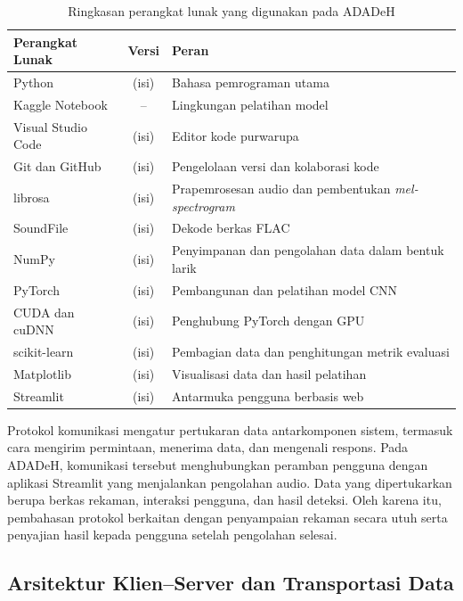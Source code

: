 \begin{table}[t]
  \centering
  \caption{Ringkasan perangkat lunak yang digunakan pada ADADeH}
  \label{tab:software}
  \begin{tabularx}{\textwidth}{| l | c | X |}
    \hline
    \textbf{Perangkat Lunak} & \textbf{Versi} & \textbf{Peran} \\
    \hline
    Python              & (isi) & Bahasa pemrograman utama \\
    Kaggle Notebook     & --    & Lingkungan pelatihan model \\
    Visual Studio Code  & (isi) & Editor kode purwarupa \\
    Git dan GitHub      & (isi) & Pengelolaan versi dan kolaborasi kode \\
    librosa             & (isi) & Prapemrosesan audio dan pembentukan \textit{mel-spectrogram} \\
    SoundFile           & (isi) & Dekode berkas FLAC \\
    NumPy               & (isi) & Penyimpanan dan pengolahan data dalam bentuk larik \\
    PyTorch             & (isi) & Pembangunan dan pelatihan model CNN \\
    CUDA dan cuDNN      & (isi) & Penghubung PyTorch dengan GPU \\
    scikit-learn        & (isi) & Pembagian data dan penghitungan metrik evaluasi \\
    Matplotlib          & (isi) & Visualisasi data dan hasil pelatihan \\
    Streamlit           & (isi) & Antarmuka pengguna berbasis web \\
    \hline
  \end{tabularx}
\end{table}

Protokol komunikasi mengatur pertukaran data antarkomponen sistem, termasuk cara mengirim permintaan, menerima data, dan mengenali respons. Pada ADADeH, komunikasi tersebut menghubungkan peramban pengguna dengan aplikasi Streamlit yang menjalankan pengolahan audio. Data yang dipertukarkan berupa berkas rekaman, interaksi pengguna, dan hasil deteksi. Oleh karena itu, pembahasan protokol berkaitan dengan penyampaian rekaman secara utuh serta penyajian hasil kepada pengguna setelah pengolahan selesai.

\subsection{Arsitektur Klien--Server dan Transportasi Data}
\label{arsitektur_klien}

